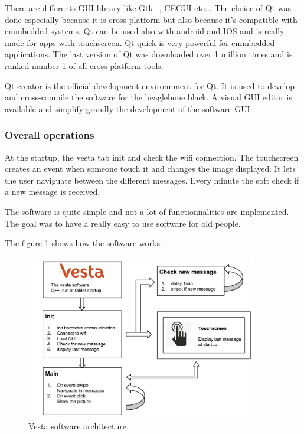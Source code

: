 There are differents GUI library like Gtk+, CEGUI etc... The choice of Qt was done especially because it is cross platform but also because it's compatible with emmbedded systems. Qt can be used also with android and IOS and is really made for apps with touchscreen. Qt quick is very powerful for emmbedded applications. The last version of Qt was downloaded over 1 million times and is ranked number 1 of all cross-platform tools.

Qt creator is the official development environnment for Qt. It is used to develop and cross-compile the software for the beaglebone black. A visual GUI editor is available and simplify grandly the development of the software GUI.

\clearpage

\subsubsection{Overall operations}
At the startup, the vesta tab init and check the wifi connection. The touchscreen creates an event when someone touch it and changes the image displayed. It lets the user naviguate between the different messages. Every minute the soft check if a new message is received.

The software is quite simple and not a lot of functionnalities are implemented. The goal was to have a really easy to use software for old people.

The figure \ref{fig:soft archi} shows how the software works.

\begin{figure}[!htb]
    \centering
    \includegraphics[width=0.9\textwidth,keepaspectratio]{chap/softFig/vesta_software_diagram2}
    \caption{Vesta software architecture.}
    \label{fig:soft archi}
\end{figure}

